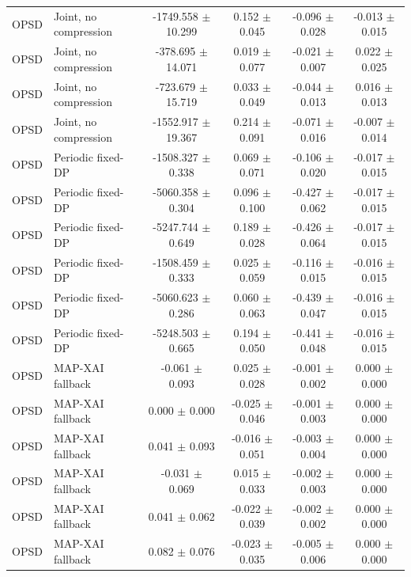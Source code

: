\begin{table}[t]
\begin{tabular}{llcccc}
OPSD & Joint, no compression & -1749.558 $\pm$ 10.299 & 0.152 $\pm$ 0.045 & -0.096 $\pm$ 0.028 & -0.013 $\pm$ 0.015 \\
OPSD & Joint, no compression & -378.695 $\pm$ 14.071 & 0.019 $\pm$ 0.077 & -0.021 $\pm$ 0.007 & 0.022 $\pm$ 0.025 \\
OPSD & Joint, no compression & -723.679 $\pm$ 15.719 & 0.033 $\pm$ 0.049 & -0.044 $\pm$ 0.013 & 0.016 $\pm$ 0.013 \\
OPSD & Joint, no compression & -1552.917 $\pm$ 19.367 & 0.214 $\pm$ 0.091 & -0.071 $\pm$ 0.016 & -0.007 $\pm$ 0.014 \\
OPSD & Periodic fixed-DP & -1508.327 $\pm$ 0.338 & 0.069 $\pm$ 0.071 & -0.106 $\pm$ 0.020 & -0.017 $\pm$ 0.015 \\
OPSD & Periodic fixed-DP & -5060.358 $\pm$ 0.304 & 0.096 $\pm$ 0.100 & -0.427 $\pm$ 0.062 & -0.017 $\pm$ 0.015 \\
OPSD & Periodic fixed-DP & -5247.744 $\pm$ 0.649 & 0.189 $\pm$ 0.028 & -0.426 $\pm$ 0.064 & -0.017 $\pm$ 0.015 \\
OPSD & Periodic fixed-DP & -1508.459 $\pm$ 0.333 & 0.025 $\pm$ 0.059 & -0.116 $\pm$ 0.015 & -0.016 $\pm$ 0.015 \\
OPSD & Periodic fixed-DP & -5060.623 $\pm$ 0.286 & 0.060 $\pm$ 0.063 & -0.439 $\pm$ 0.047 & -0.016 $\pm$ 0.015 \\
OPSD & Periodic fixed-DP & -5248.503 $\pm$ 0.665 & 0.194 $\pm$ 0.050 & -0.441 $\pm$ 0.048 & -0.016 $\pm$ 0.015 \\
OPSD & MAP-XAI fallback & -0.061 $\pm$ 0.093 & 0.025 $\pm$ 0.028 & -0.001 $\pm$ 0.002 & 0.000 $\pm$ 0.000 \\
OPSD & MAP-XAI fallback & 0.000 $\pm$ 0.000 & -0.025 $\pm$ 0.046 & -0.001 $\pm$ 0.003 & 0.000 $\pm$ 0.000 \\
OPSD & MAP-XAI fallback & 0.041 $\pm$ 0.093 & -0.016 $\pm$ 0.051 & -0.003 $\pm$ 0.004 & 0.000 $\pm$ 0.000 \\
OPSD & MAP-XAI fallback & -0.031 $\pm$ 0.069 & 0.015 $\pm$ 0.033 & -0.002 $\pm$ 0.003 & 0.000 $\pm$ 0.000 \\
OPSD & MAP-XAI fallback & 0.041 $\pm$ 0.062 & -0.022 $\pm$ 0.039 & -0.002 $\pm$ 0.002 & 0.000 $\pm$ 0.000 \\
OPSD & MAP-XAI fallback & 0.082 $\pm$ 0.076 & -0.023 $\pm$ 0.035 & -0.005 $\pm$ 0.006 & 0.000 $\pm$ 0.000 \\
\bottomrule
\end{tabular}
\end{table}

